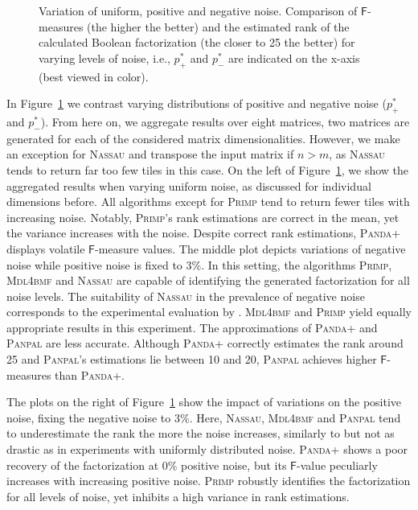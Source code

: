 \begin{figure}
\centering

\caption{Variation of uniform, positive and negative noise. Comparison of $\mathsf{F}$-measures (the higher the better) and the estimated rank of the calculated Boolean factorization (the closer to 25 the better) for varying levels of noise, i.e., $p_+^*$ and $p_-^*$ are indicated on the x-axis (best viewed in color).}
\label{fig:noise}
\end{figure}
In Figure~\ref{fig:noise} we contrast varying distributions of positive and negative noise ($p_+^*$ and $p_-^*$). From here on, we aggregate results over eight matrices, two matrices are generated for each of the considered matrix dimensionalities. However, we make an exception for \textsc{Nassau} and transpose the input matrix if $n>m$, as \textsc{Nassau} tends to return far too few tiles in this case.
On the left of Figure~\ref{fig:noise}, we show the aggregated results when varying uniform noise, as discussed for individual dimensions before. All algorithms except for \textsc{Primp} tend to return fewer tiles with increasing noise. Notably, \textsc{Primp}'s rank estimations are correct in the mean, yet the variance increases with the noise. Despite correct rank estimations, \textsc{Panda+} displays volatile $\mathsf{F}$-measure values.
The middle plot depicts variations of negative noise while positive noise is fixed to $3\%$. In this setting, the algorithms \textsc{Primp}, \textsc{Mdl4bmf} and \textsc{Nassau} are capable of identifying the generated factorization for all noise levels. The suitability of \textsc{Nassau} in the prevalence of negative noise corresponds to the experimental evaluation by \cite{karaev2015getting}. \textsc{Mdl4bmf} and \textsc{Primp} yield  equally appropriate results in this experiment.  The approximations of \textsc{Panda+} and \textsc{Panpal} are less accurate. Although \textsc{Panda+} correctly estimates the rank around 25 and \textsc{Panpal}'s estimations lie between 10 and 20, \textsc{Panpal} achieves higher $\mathsf{F}$-measures than \textsc{Panda+}.  

The plots on the right of Figure~\ref{fig:noise} show the impact of variations on the positive noise, fixing the negative noise to $3\%$. Here, \textsc{Nassau}, \textsc{Mdl4bmf} and \textsc{Panpal} tend to underestimate the rank the more the noise increases, similarly to but not as drastic as in experiments with uniformly distributed noise. \textsc{Panda+} shows a poor recovery of the factorization at $0\%$  positive noise, but its $\mathsf{F}$-value peculiarly increases with increasing positive noise.  \textsc{Primp} robustly identifies the factorization for all levels of noise, yet inhibits a high variance in rank estimations.
